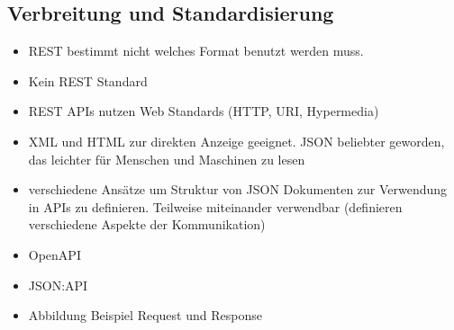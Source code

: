 \subsection{Verbreitung und Standardisierung}
\begin{itemize}
  \item REST bestimmt nicht welches Format benutzt werden muss.
  \item Kein REST Standard
  \item REST APIs nutzen Web Standards (HTTP, URI, Hypermedia)
  \item XML und HTML zur direkten Anzeige geeignet. JSON beliebter geworden, das leichter für Menschen und Maschinen zu lesen
  \item verschiedene Ansätze um Struktur von JSON Dokumenten zur Verwendung in APIs zu definieren. Teilweise miteinander verwendbar (definieren verschiedene Aspekte der Kommunikation)
  \item OpenAPI
  \item JSON:API
  \item Abbildung Beispiel Request und Response
\end{itemize}
